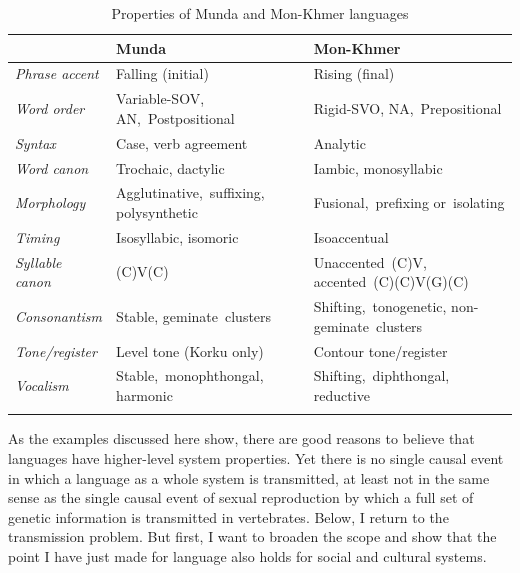 \begin{table}[h]
\begin{tabularx}{\textwidth}{>{\itshape}XXX}
\lsptoprule
 & \textbf{Munda} & \textbf{Mon-Khmer} \\
\midrule
Phrase accent & Falling (initial)                & Rising (final) \\[.3em]
Word order    & Variable-SOV, 
                \mbox{AN, Postpositional}        & Rigid-SVO, 
               \mbox{NA, Prepositional} \\[.3em]
Syntax        & Case, verb agreement             & Analytic \\[.3em]
Word canon    & Trochaic, dactylic               & Iambic, monosyllabic \\[.3em]
Morphology    & \mbox{Agglutinative, suffixing,} 
                 polysynthetic                   & \mbox{Fusional, prefixing} 
\mbox{or isolating} \\[.3em]
Timing        & Isosyllabic, isomoric           & Isoaccentual \\[.3em]
Syllable canon& (C)V(C)                         & \mbox{Unaccented (C)V,} 
       \mbox{accented (C)(C)V(G)(C)} \\[.3em]
Consonantism  & Stable, 
               \mbox{geminate clusters}         & \mbox{Shifting, tonogenetic,} 
       \mbox{non-geminate clusters} \\[.3em]
Tone/register & Level tone (Korku only)         & Contour tone/register \\[.3em]
Vocalism      & \mbox{Stable, monophthongal,}
       \mbox{harmonic}                & \mbox{Shifting, diphthongal,} 
\mbox{reductive} \\[.3em]
\lspbottomrule
\end{tabularx}
\caption{Properties of Munda and Mon-Khmer languages}
\label{mundamonkhmer}
\end{table} 



As the examples discussed here show, there are good reasons to believe 
that languages have higher-level system properties. Yet there is no 
single causal event in which a language as a whole system is transmitted, at least not in the same sense as the single causal event of sexual reproduction by which a full set 
of genetic information is transmitted in vertebrates. Below, I return to the 
transmission problem. But first, I want to broaden the scope and show that 
the point I have just made for language also holds for social and 
cultural systems. 


